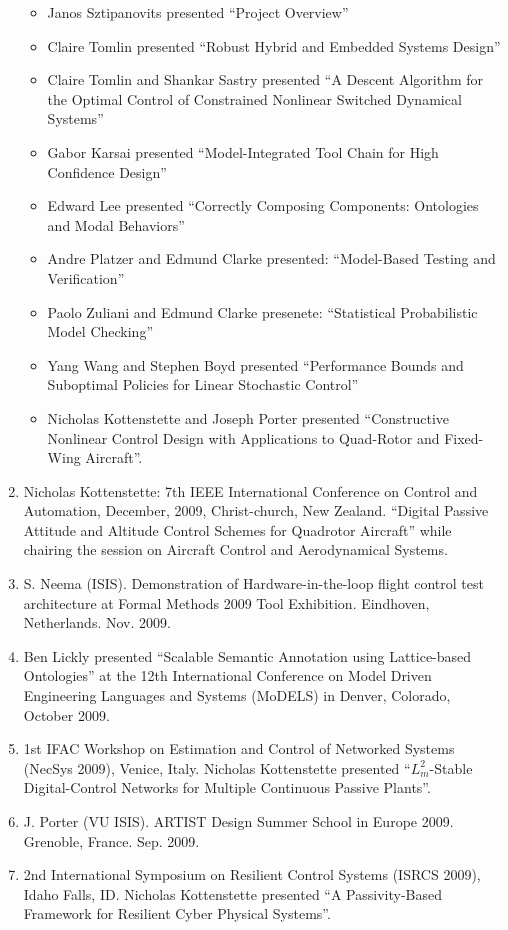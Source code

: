 \begin{enumerate}
\begin{itemize}
\item Janos Sztipanovits presented ``Project Overview''
\item Claire Tomlin presented ``Robust Hybrid and Embedded Systems Design''
\item Claire Tomlin and Shankar Sastry presented ``A Descent Algorithm for the Optimal Control of Constrained Nonlinear Switched Dynamical Systems''
\item Gabor Karsai presented ``Model-Integrated Tool Chain for High Confidence Design''
\item Edward Lee presented ``Correctly Composing Components: Ontologies and Modal Behaviors''
\item Andre Platzer and Edmund Clarke presented: ``Model-Based Testing and Verification''
\item Paolo Zuliani and Edmund Clarke presenete: ``Statistical Probabilistic Model Checking''
\item Yang Wang and Stephen Boyd presented ``Performance Bounds and Suboptimal Policies for Linear Stochastic Control''
\item Nicholas Kottenstette and Joseph Porter presented “Constructive Nonlinear Control Design with Applications to Quad-Rotor and Fixed-Wing Aircraft”.
\end{itemize}
\item Nicholas Kottenstette: 7th IEEE International Conference on Control and Automation, December, 2009, Christ-church, New Zealand. ``Digital Passive Attitude and Altitude Control Schemes for Quadrotor Aircraft'' while chairing the session on Aircraft Control and Aerodynamical Systems.
\item S. Neema (ISIS).  Demonstration of Hardware-in-the-loop flight control test architecture at Formal Methods 2009 Tool Exhibition. Eindhoven, Netherlands.  Nov. 2009.
\item Ben Lickly presented ``Scalable Semantic Annotation using Lattice-based Ontologies'' at the 12th International Conference on Model Driven Engineering Languages and Systems (MoDELS) in Denver, Colorado, October 2009.
\item 1st IFAC Workshop on Estimation and Control of Networked Systems (NecSys 2009), Venice, Italy. Nicholas Kottenstette presented ``$L_m^2$-Stable Digital-Control Networks for Multiple Continuous Passive Plants''.
\item J. Porter (VU ISIS).  ARTIST Design Summer School in Europe 2009. Grenoble, France. Sep. 2009.
\item 2nd International Symposium on Resilient Control Systems (ISRCS 2009), Idaho Falls, ID.  Nicholas Kottenstette presented ``A Passivity-Based Framework for Resilient Cyber Physical Systems''.

\end{enumerate}
